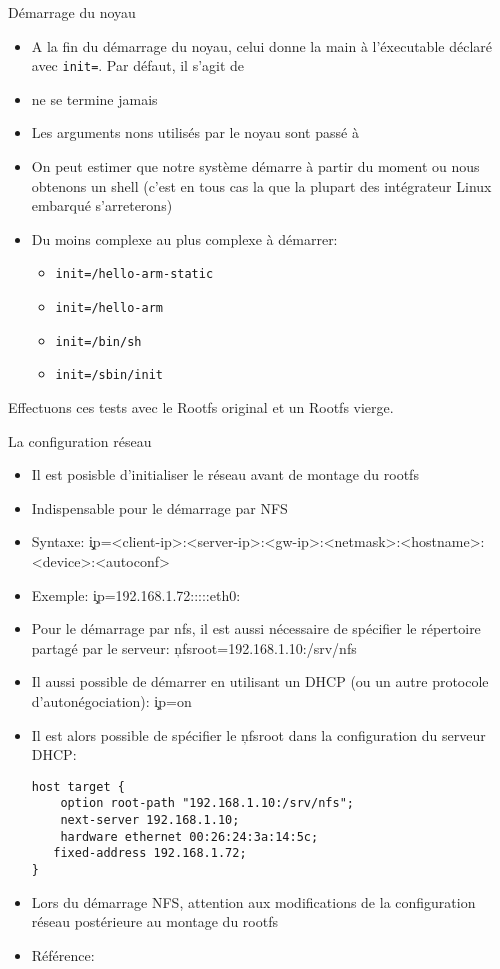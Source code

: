 \begin{frame}[fragile=singleslide]{Démarrage du noyau}
  \begin{itemize}
  \item  A  la fin  du  démarrage  du noyau,  celui  donne  la main  à
    l'éxecutable déclaré  avec \verb+init=+. Par défaut,  il s'agit de
  \item {} ne se termine jamais
  \item  Les  arguments  nons  utilisés  par le  noyau  sont  passé  à
  \item On peut  estimer que notre système démarre  à partir du moment
    ou nous  obtenons un shell (c'est  en tous cas  la que la
      plupart des intégrateur Linux embarqué s'arreterons)
  \item Du moins complexe au plus complexe à démarrer:
  \begin{itemize}
    \item \verb+init=/hello-arm-static+
    \item \verb+init=/hello-arm+
    \item \verb+init=/bin/sh+
    \item \verb+init=/sbin/init+
    \end{itemize}
  \end{itemize}
  Effectuons ces tests avec le Rootfs original et un Rootfs vierge.
\end{frame}

\begin{frame}[fragile=singleslide]{La configuration réseau}
  \begin{itemize}
  \item Il est posisble d'initialiser le réseau avant de montage du rootfs
  \item Indispensable pour le démarrage par NFS
   \item Syntaxe: \c{ip=<client-ip>:<server-ip>:<gw-ip>:<netmask>:<hostname>:<device>:<autoconf>} 
   \item Exemple: \c{ip=192.168.1.72:::::eth0:}
   \item  Pour  le démarrage  par  nfs,  il  est aussi  nécessaire  de
     spécifier    le    répertoire    partagé    par    le    serveur:
     \c{nfsroot=192.168.1.10:/srv/nfs}
   \item Il  aussi possible  de démarrer en  utilisant un DHCP  (ou un
     autre protocole d'autonégociation): \c{ip=on}
   \item Il  est alors  possible de spécifier  le \c{nfsroot}  dans la
     configuration du serveur DHCP:
     \begin{lstlisting} 
host target {
    option root-path "192.168.1.10:/srv/nfs";
    next-server 192.168.1.10;
    hardware ethernet 00:26:24:3a:14:5c;
   fixed-address 192.168.1.72;
}
     \end{lstlisting} 
   \item  Lors du  démarrage  NFS, attention  aux  modifications de  la
    configuration réseau postérieure au montage du rootfs
    \item Référence: 
  \end{itemize} 
\end{frame} 

